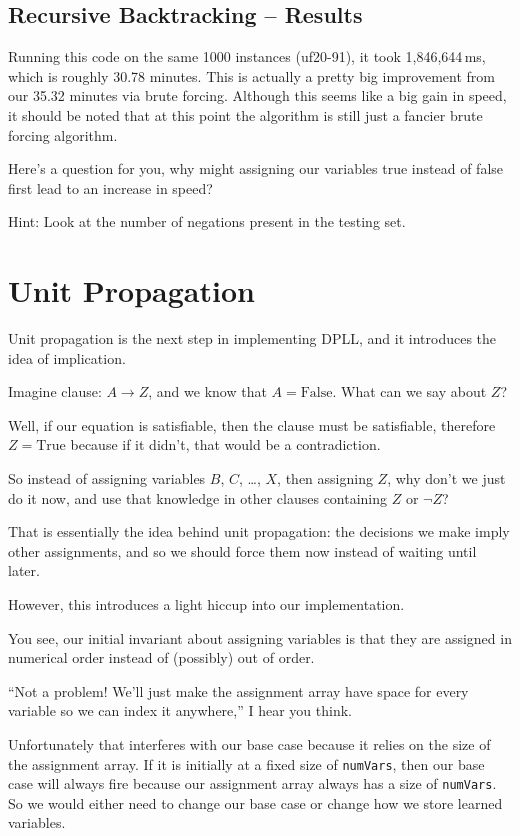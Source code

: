 \subsection{Recursive Backtracking -- Results}

Running this code on the same 1000 instances (uf20-91), it took
1,846,644\,ms, which is roughly 30.78 minutes. This is actually a pretty big
improvement from our 35.32 minutes via brute forcing. Although this seems
like a big gain in speed, it should be noted that at this point the algorithm is
still just a fancier brute forcing algorithm.

Here's a question for you, why might assigning our variables true instead of
false first lead to an increase in speed?

Hint: Look at the number of negations present in the testing set.

\section{Unit Propagation}

Unit propagation is the next step in implementing DPLL, and it introduces the
idea of implication.

Imagine clause: $A \rightarrow Z$, and we know that $A = \text{False}$. What
can we say about $Z$?

Well, if our equation is satisfiable, then the clause must be satisfiable,
therefore $Z = \text{True}$ because if it didn't, that would be a contradiction.

So instead of assigning variables $B$, $C$, \ldots, $X$, then assigning $Z$,
why don't we just do it now, and use that knowledge in other clauses
containing $Z$ or $\neg Z$?

That is essentially the idea behind unit propagation: the decisions we make
imply other assignments, and so we should force them now instead of waiting
until later.

However, this introduces a light hiccup into our implementation.

You see, our initial invariant about assigning variables is that they are
assigned in numerical order instead of (possibly) out of order.

``Not a problem! We'll just make the assignment array have space for every
variable so we can index it anywhere,'' I hear you think.

Unfortunately that interferes with our base case because it relies on the size
of the assignment array. If it is initially at a fixed size of
\texttt{numVars}, then our base case will always fire because our assignment
array always has a size of \texttt{numVars}. So we would either need to
change our base case or change how we store learned variables.

